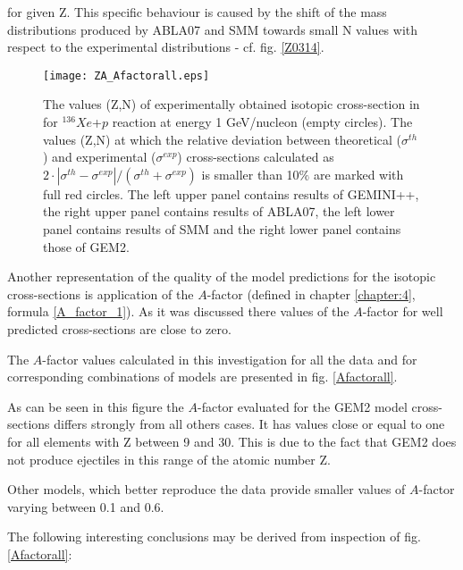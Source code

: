 for given Z. This specific behaviour is caused by the shift 
of the mass distributions produced by ABLA07 and SMM 
towards small N values with respect to the experimental
distributions - cf. fig. \ref{Z0314}.
\begin{figure}
    \centering
    \texttt{[image: ZA\_Afactorall.eps]}
    \caption{The values (Z,N) of experimentally obtained isotopic cross-section in  \cite{napolitani2007measurement} for $^{136}Xe$+$p$ reaction at energy 1 GeV/nucleon (empty circles). The values (Z,N) at which the relative deviation between theoretical ($\sigma^{th}$) and experimental ($\sigma^{exp}$) cross-sections calculated as $2\cdot\left| \sigma^{th}- \sigma^{exp} \right|/(\sigma^{th} + \sigma^{exp})$ is smaller than 10$\%$ are marked with full red circles. The left upper panel contains results of GEMINI++, the right upper panel contains results of ABLA07, the left lower panel contains results of SMM and the right lower panel contains those of GEM2.}
    \label{ZAfactor}
\end{figure}

Another representation of the quality of the model predictions for the isotopic 
cross-sections is application of the $A$-factor (defined in chapter \ref{chapter:4}, formula \ref{A_factor_1}). As it was discussed there  values of the $A$-factor for well predicted 
cross-sections are close to zero. 

The $A$-factor values calculated in this investigation for all the data and for  corresponding combinations of models are presented in fig. \ref{Afactorall}. 

As can be seen in this figure the $A$-factor evaluated
for the GEM2 model cross-sections differs strongly from all others cases. It has values close or equal to one for all
elements with Z between 9 and 30. This is due to the
fact that GEM2 does not produce ejectiles 
in this range of the atomic number Z. 

Other models, which better
reproduce the data provide smaller values of $A$-factor varying between 0.1 and 0.6. 

The following interesting conclusions may be derived from inspection of fig. \ref{Afactorall}:

